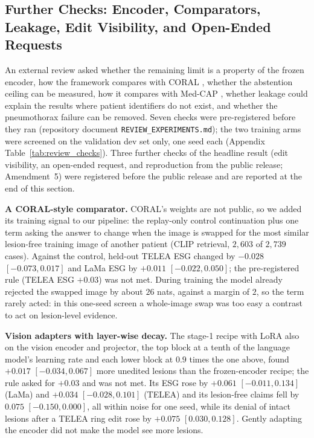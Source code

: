 \documentclass[5p,times,twocolumn,authoryear]{elsarticle}
\begin{document}
\subsection{Further Checks: Encoder, Comparators, Leakage, Edit Visibility, and Open-Ended Requests}
\label{subsec:exp_review}
An external review asked whether the remaining limit is a property of the frozen encoder, how the framework compares with CORAL \citep{zafar2026coral}, whether the abstention ceiling can be measured, how it compares with Med-CAP \citep{huang2026medcap}, whether leakage could explain the results where patient identifiers do not exist, and whether the pneumothorax failure can be removed. Seven checks were pre-registered before they ran (repository document \texttt{REVIEW\_EXPERIMENTS.md}); the two training arms were screened on the validation dev set only, one seed each (Appendix Table~\ref{tab:review_checks}). Three further checks of the headline result (edit visibility, an open-ended request, and reproduction from the public release; Amendment~5) were registered before the public release and are reported at the end of this section.

\textbf{A CORAL-style comparator.} CORAL's weights are not public, so we added its training signal to our pipeline: the replay-only control continuation plus one term asking the answer to change when the image is swapped for the most similar lesion-free training image of another patient (CLIP retrieval, $2{,}603$ of $2{,}739$ cases). Against the control, held-out TELEA ESG changed by $-0.028$ $[-0.073, 0.017]$ and LaMa ESG by $+0.011$ $[-0.022, 0.050]$; the pre-registered rule (TELEA ESG $+0.03$) was not met. During training the model already rejected the swapped image by about $26$ nats, against a margin of $2$, so the term rarely acted: in this one-seed screen a whole-image swap was too easy a contrast to act on lesion-level evidence.

\textbf{Vision adapters with layer-wise decay.} The stage-1 recipe with LoRA also on the vision encoder and projector, the top block at a tenth of the language model's learning rate and each lower block at $0.9$ times the one above, found $+0.017$ $[-0.034, 0.067]$ more unedited lesions than the frozen-encoder recipe; the rule asked for $+0.03$ and was not met. Its ESG rose by $+0.061$ $[-0.011, 0.134]$ (LaMa) and $+0.034$ $[-0.028, 0.101]$ (TELEA) and its lesion-free claims fell by $0.075$ $[-0.150, 0.000]$, all within noise for one seed, while its denial of intact lesions after a TELEA ring edit rose by $+0.075$ $[0.030, 0.128]$. Gently adapting the encoder did not make the model see more lesions.
\end{document}
